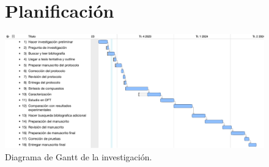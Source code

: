 \documentclass[spanish,mexico]{scrartcl}
\begin{document}
\begin{figure}
    \section{Planificación}
    \includegraphics[width=0.9\linewidth]{gantt.pdf}
    \caption{Diagrama de Gantt de la investigación.}
    \label{fig:gantt}
\end{figure}
\printreactants{}
\printglossaries{}
\printbibliography{}

\listoftodos[Pendientes]
\end{document}
